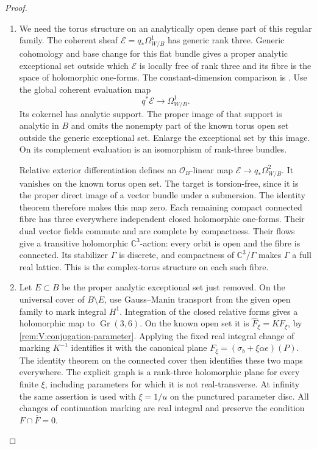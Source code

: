 \documentclass[11pt,a4paper]{article}
\numberwithin{equation}{section}
\theoremstyle{definition}
\begin{document}
\begin{proof}
\begin{enumerate}[label=\arabic*.]
\item We need the torus structure on an analytically open dense
part of this regular family.  The coherent sheaf
$\mathcal E=q_*\Omega^1_{W/B}$ has generic rank three.
Generic cohomology and base change for this flat bundle gives
a proper analytic exceptional set outside which $\mathcal E$
is locally free of rank three and its fibre is the space of
holomorphic one-forms.  The constant-dimension comparison is
\cite[\S7, Satz 5, pp.~63--64]{Grauert60}.
Use the global coherent evaluation map
\[
 q^*\mathcal E\longrightarrow\Omega^1_{W/B}.
\]
Its cokernel has analytic support.  The proper image of that
support is analytic in $B$ and omits the nonempty part of the
known torus open set outside the generic exceptional set.
Enlarge the exceptional set by this image.  On its complement
evaluation is an isomorphism of rank-three bundles.

Relative exterior differentiation defines an
$\mathcal O_B$-linear map
$\mathcal E\to q_*\Omega^2_{W/B}$.  It vanishes on the known
torus open set.  The target is torsion-free, since it is the
proper direct image of a vector bundle under a submersion.
The identity theorem therefore makes this map zero.  Each
remaining compact connected fibre has three everywhere
independent closed holomorphic one-forms.  Their dual vector
fields commute and are complete by compactness.  Their flows
give a transitive holomorphic $\mathbb C^3$-action: every orbit
is open and the fibre is connected.  Its stabilizer $\Gamma$
is discrete, and compactness of $\mathbb C^3/\Gamma$ makes
$\Gamma$ a full real lattice.  This is the complex-torus
structure on each such fibre.

\item Let $E\subset B$ be the proper analytic exceptional set just
removed.  On the universal cover of $B\setminus E$, use
Gauss--Manin transport from the given open family to mark
integral $H^1$.  Integration of the closed relative forms
gives a holomorphic map to $\operatorname{Gr}(3,6)$.  On the
known open set it is
$\widehat F_\xi=K F_\xi$, by
\cref{rem:V:conjugation-parameter}. Applying the fixed real
integral change of marking $K^{-1}$ identifies it with the
canonical plane $F_\xi=(\sigma_b+\xi\alpha e)(P)$.
The identity theorem on the connected cover then identifies
these two maps everywhere.
The explicit graph is a rank-three holomorphic plane for
every finite $\xi$, including parameters for which it is not
real-transverse.  At infinity the same assertion is used with
$\xi=1/u$ on the punctured parameter disc.  All changes of
continuation marking are real integral and preserve the
condition $F\cap\bar F=0$.


\end{enumerate}
\end{proof}
\end{document}
